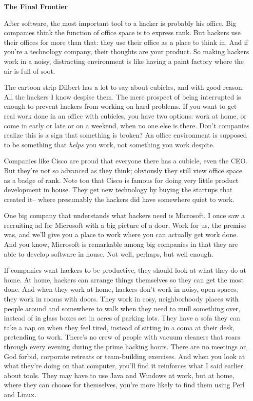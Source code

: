 \textbf{The Final Frontier}

After software, the most important tool to a hacker is probably his
office. Big companies think the function of office space is to express
rank. But hackers use their offices for more than that: they use their
office as a place to think in. And if you're a technology company, their
thoughts are your product. So making hackers work in a noisy,
distracting environment is like having a paint factory where the air is
full of soot.

The cartoon strip Dilbert has a lot to say about cubicles, and with good
reason. All the hackers I know despise them. The mere prospect of being
interrupted is enough to prevent hackers from working on hard problems.
If you want to get real work done in an office with cubicles, you have
two options: work at home, or come in early or late or on a weekend,
when no one else is there. Don't companies realize this is a sign that
something is broken? An office environment is supposed to be something
that \emph{helps} you work, not something you work despite.

Companies like Cisco are proud that everyone there has a cubicle, even
the CEO. But they're not so advanced as they think; obviously they still
view office space as a badge of rank. Note too that Cisco is famous for
doing very little product development in house. They get new technology
by buying the startups that created it-- where presumably the hackers
did have somewhere quiet to work.

One big company that understands what hackers need is Microsoft. I once
saw a recruiting ad for Microsoft with a big picture of a door. Work for
us, the premise was, and we'll give you a place to work where you can
actually get work done. And you know, Microsoft is remarkable among big
companies in that they are able to develop software in house. Not well,
perhaps, but well enough.

If companies want hackers to be productive, they should look at what
they do at home. At home, hackers can arrange things themselves so they
can get the most done. And when they work at home, hackers don't work in
noisy, open spaces; they work in rooms with doors. They work in cosy,
neighborhoody places with people around and somewhere to walk when they
need to mull something over, instead of in glass boxes set in acres of
parking lots. They have a sofa they can take a nap on when they feel
tired, instead of sitting in a coma at their desk, pretending to work.
There's no crew of people with vacuum cleaners that roars through every
evening during the prime hacking hours. There are no meetings or, God
forbid, corporate retreats or team-building exercises. And when you look
at what they're doing on that computer, you'll find it reinforces what I
said earlier about tools. They may have to use Java and Windows at work,
but at home, where they can choose for themselves, you're more likely to
find them using Perl and Linux.

